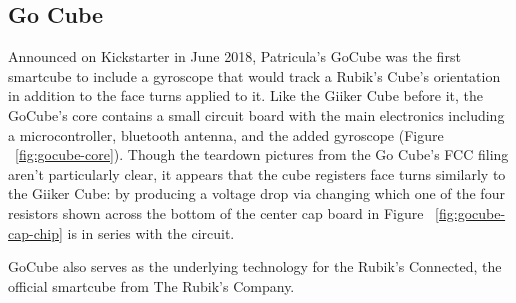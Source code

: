 \subsection{Go Cube}
Announced on Kickstarter in June 2018, Patricula's GoCube was the first smartcube to include a gyroscope that would track a Rubik's Cube's orientation in addition to the face turns applied to it. \cite{gocube-product-launch-video}
Like the Giiker Cube before it, the GoCube's core contains a small circuit board with the main electronics including a microcontroller, bluetooth antenna, and the added gyroscope (Figure ~\ref{fig:gocube-core}). 
Though the teardown pictures from the Go Cube's FCC filing aren't particularly clear, it appears that the cube registers face turns similarly to the Giiker Cube: by producing a voltage drop via changing which one of the four resistors shown across the bottom of the center cap board in Figure ~\ref{fig:gocube-cap-chip} is in series with the circuit.

GoCube also serves as the underlying technology for the Rubik's Connected, the official smartcube from The Rubik's Company. \cite{gocube-rubiksconnected}

